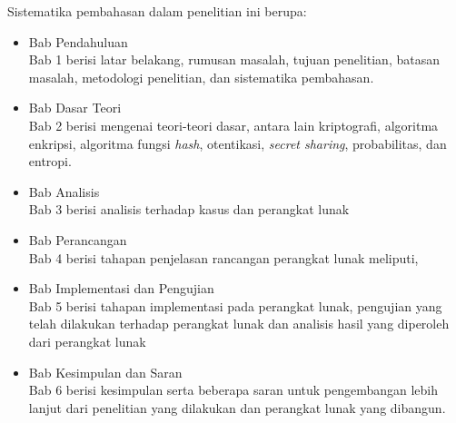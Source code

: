 Sistematika pembahasan dalam penelitian ini berupa:
\begin{itemize}
	\item Bab Pendahuluan
	\\Bab 1 berisi latar belakang, rumusan masalah, tujuan penelitian, batasan masalah, metodologi penelitian, dan sistematika pembahasan.
	\item Bab Dasar Teori
	\\Bab 2 berisi mengenai teori-teori dasar, antara lain kriptografi, algoritma enkripsi, algoritma fungsi \textit{hash}, otentikasi, \textit{secret sharing}, probabilitas, dan entropi.
	\item Bab Analisis
	\\Bab 3 berisi analisis terhadap kasus dan perangkat lunak
	\item Bab Perancangan
	\\Bab 4 berisi tahapan penjelasan rancangan perangkat lunak meliputi,
	\item Bab Implementasi dan Pengujian
	\\Bab 5 berisi tahapan implementasi pada perangkat lunak, pengujian yang telah dilakukan terhadap perangkat lunak dan analisis hasil yang diperoleh dari perangkat lunak
	\item Bab Kesimpulan dan Saran
	\\Bab 6 berisi kesimpulan serta beberapa saran untuk pengembangan lebih lanjut dari penelitian yang dilakukan dan perangkat lunak yang dibangun.
\end{itemize}